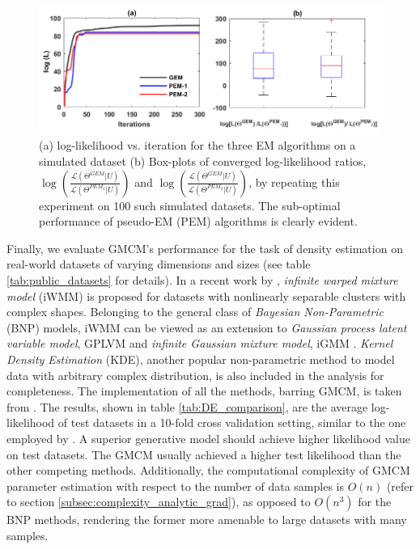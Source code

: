 \documentclass{article}
\begin{document}
\begin{figure}[ht]
\includegraphics[width= 380pt,keepaspectratio=true]{figures/EM_algo_comparisons}
\caption{(a) log-likelihood vs. iteration for the three EM algorithms on a simulated dataset (b) Box-plots of converged log-likelihood ratios,  $\log\left( \frac{\mathcal{L}\left(\Theta^{GEM}|U\right)}{\mathcal{L}\left(\Theta^{PEM_1}|U\right)}\right)$ and $\log\left( \frac{\mathcal{L}\left(\Theta^{GEM}|U\right)}{\mathcal{L}\left(\Theta^{PEM_2}|U\right)}\right)$, by repeating this experiment on 100 such simulated datasets. The sub-optimal performance of pseudo-EM (PEM) algorithms is clearly evident.}
\label{fig:EM_algo_comp}
\end{figure}  

Finally, we evaluate GMCM's performance for the task of density estimation on real-world datasets of varying dimensions and sizes (see table \ref{tab:public_datasets} for details). In a recent work by \citet{Iwata2012}, \emph{infinite warped mixture model} (iWMM) is proposed for datasets with nonlinearly separable clusters with complex shapes. Belonging to the general class of \emph{Bayesian Non-Parametric} (BNP) models,  iWMM can be viewed as an extension to \emph{Gaussian process latent variable model}, GPLVM \citep{Lawrence2003} and \emph{infinite Gaussian mixture model}, iGMM \citep{Rasmussen1999}. \emph{Kernel Density Estimation} (KDE), another popular non-parametric method to model data with arbitrary complex distribution, is also included in the analysis for completeness. The implementation of all the methods, barring GMCM, is taken from \citep{Duvenaud2013}. The results, shown in table \ref{tab:DE_comparison}, are the average log-likelihood of test datasets in a 10-fold cross validation setting, similar to the one employed by \citet{Iwata2012}. A superior generative model should achieve higher likelihood value on test datasets. The GMCM usually achieved a higher test likelihood than the other competing methods. Additionally, the computational complexity of GMCM parameter estimation with respect to the number of data samples is $O(n)$ (refer to section \ref{subsec:complexity_analytic_grad}), as opposed to $O(n^3)$ for the BNP methods, rendering the former more amenable to large datasets with many samples.
 
\end{document}
